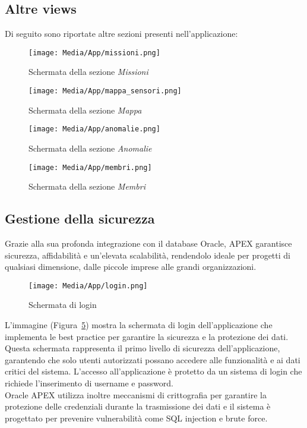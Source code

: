 \subsection{Altre views}
Di seguito sono riportate altre sezioni presenti nell'applicazione:
\begin{figure}[ht!]
    \centering
    \texttt{[image: Media/App/missioni.png]}
    \caption{Schermata della sezione \textit{Missioni}}
    \label{fig:missioni}
\end{figure}
\begin{figure}[ht!]
    \centering
    \texttt{[image: Media/App/mappa\_sensori.png]}
    \caption{Schermata della sezione \textit{Mappa}}
    \label{fig:mappa}
\end{figure}
\begin{figure}[ht!]
    \centering
    \texttt{[image: Media/App/anomalie.png]}
    \caption{Schermata della sezione \textit{Anomalie}}
    \label{fig:anomalie}
\end{figure}
\begin{figure}[ht!]
    \centering
    \texttt{[image: Media/App/membri.png]}
    \caption{Schermata della sezione \textit{Membri}}
    \label{fig:membri}
\end{figure}

\newpage
\subsection{Gestione della sicurezza}
Grazie alla sua profonda integrazione con il database Oracle, APEX garantisce sicurezza, affidabilità e un'elevata scalabilità, rendendolo ideale per progetti di qualsiasi dimensione, dalle piccole imprese alle grandi organizzazioni. \\

\begin{figure}[ht!]
    \centering
    \texttt{[image: Media/App/login.png]}
    \caption{Schermata di login}
    \label{fig:login}
\end{figure}

\noindent
L'immagine (Figura~\ref{fig:login}) mostra la schermata di login dell'applicazione che implementa le best practice per garantire la sicurezza e la protezione dei dati. Questa schermata rappresenta il primo livello di sicurezza dell'applicazione, garantendo che solo utenti autorizzati possano accedere alle funzionalità e ai dati critici del sistema.
L'accesso all'applicazione è protetto da un sistema di login che richiede l'inserimento di username e password.\\
Oracle APEX utilizza inoltre meccanismi di crittografia per garantire la protezione delle credenziali durante la trasmissione dei dati e il sistema è progettato per prevenire vulnerabilità come SQL injection e brute force.




